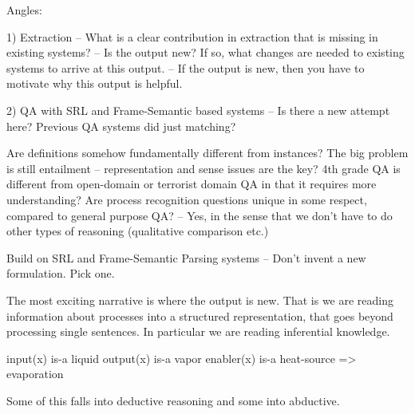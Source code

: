 

Angles:

1) Extraction 
	-- What is a clear contribution in extraction that is missing in existing systems?
	-- Is the output new? If so, what changes are needed to existing systems to arrive at this output.
	-- If the output is new, then you have to motivate why this output is helpful. 
	
2) QA with SRL and Frame-Semantic based systems 
	-- Is there a new attempt here? Previous QA systems did just matching? 

Are definitions somehow fundamentally different from instances?
The big problem is still entailment -- representation and sense issues are the key? 
4th grade QA is different from open-domain or terrorist domain QA in that it requires more understanding? 
Are process recognition questions unique in some respect, compared to general purpose QA? 
	-- Yes, in the sense that we don't have to do other types of reasoning (qualitative comparison etc.)

Build on SRL and Frame-Semantic Parsing systems 
	-- Don't invent a new formulation. Pick one.
	
	

The most exciting narrative is where the output is new. That is we are reading information about processes into a structured representation, that goes beyond processing single sentences. In particular we are reading inferential knowledge. 

input(x) is-a liquid
output(x) is-a vapor
enabler(x) is-a heat-source
	=> evaporation
	
Some of this falls into deductive reasoning and some into abductive.

	